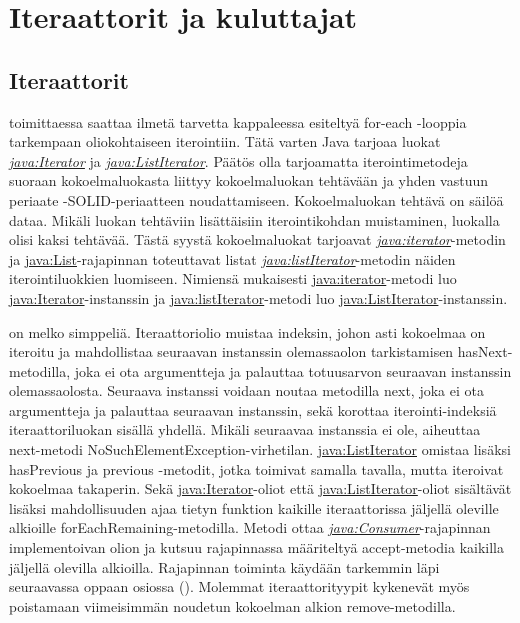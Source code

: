 \documentclass{tufte-book}
\newcommand{\java}[1]{\underline{\gls{java:#1}}}
\newcommand{\newjava}[1]{\textit{\java{#1}}}
\begin{document}
\section{Iteraattorit ja kuluttajat}
\label{iterators+consumers}

\subsection{Iteraattorit}
\label{iterators}

 toimittaessa saattaa ilmetä tarvetta kappaleessa 
esiteltyä for-each -looppia tarkempaan oliokohtaiseen iterointiin. Tätä varten Java tarjoaa luokat
\newjava{Iterator} ja \newjava{ListIterator}. Päätös olla tarjoamatta iterointimetodeja suoraan
kokoelmaluokasta liittyy kokoelmaluokan tehtävään ja \gls{yhden vastuun periaate}
-SOLID-periaatteen noudattamiseen. Kokoelmaluokan tehtävä on säilöä dataa. Mikäli luokan
tehtäviin lisättäisiin iterointikohdan muistaminen, luokalla olisi kaksi tehtävää. Tästä syystä
kokoelmaluokat tarjoavat \newjava{iterator}-metodin ja \java{List}-rajapinnan toteuttavat listat
\newjava{listIterator}-metodin näiden iterointiluokkien luomiseen. Nimiensä mukaisesti
\java{iterator}-metodi luo \java{Iterator}-instanssin ja \java{listIterator}-metodi luo
\java{ListIterator}-instanssin.

 on melko simppeliä. Iteraattoriolio muistaa indeksin, johon
asti kokoelmaa on iteroitu ja mahdollistaa seuraavan instanssin olemassaolon tarkistamisen
hasNext-metodilla, joka ei ota argumentteja ja palauttaa totuusarvon seuraavan instanssin
olemassaolosta. Seuraava instanssi voidaan noutaa metodilla next, joka ei ota argumentteja ja
palauttaa seuraavan instanssin, sekä korottaa iterointi-indeksiä iteraattoriluokan sisällä
yhdellä. Mikäli seuraavaa instanssia ei ole, aiheuttaa next-metodi
NoSuchElementException-virhetilan. \java{ListIterator} omistaa lisäksi hasPrevious ja previous
-metodit, jotka toimivat samalla tavalla, mutta iteroivat kokoelmaa takaperin. Sekä
\java{Iterator}-oliot että \java{ListIterator}-oliot sisältävät lisäksi mahdollisuuden ajaa
tietyn funktion kaikille iteraattorissa jäljellä oleville alkioille forEachRemaining-metodilla.
Metodi ottaa \newjava{Consumer}-rajapinnan implementoivan olion ja kutsuu rajapinnassa
määriteltyä accept-metodia kaikilla jäljellä olevilla alkioilla. Rajapinnan toiminta käydään
tarkemmin läpi seuraavassa oppaan osiossa (). Molemmat iteraattorityypit
kykenevät myös poistamaan viimeisimmän noudetun kokoelman alkion remove-metodilla.
\end{document}
